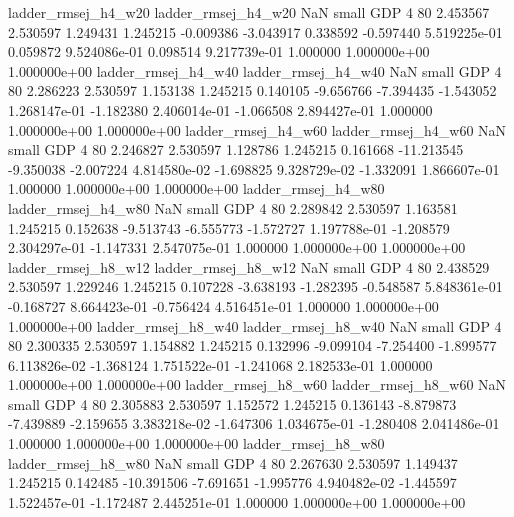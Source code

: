      ladder_rmsej_h4_w20      ladder_rmsej_h4_w20                   NaN      small      GDP                 4 80 2.453567       2.530597 1.249431       1.245215   -0.009386     -3.043917      0.338592    -0.597440   5.519225e-01  0.059872 9.524086e-01     0.098514   9.217739e-01            1.000000    1.000000e+00        1.000000e+00
     ladder_rmsej_h4_w40      ladder_rmsej_h4_w40                   NaN      small      GDP                 4 80 2.286223       2.530597 1.153138       1.245215    0.140105     -9.656766     -7.394435    -1.543052   1.268147e-01 -1.182380 2.406014e-01    -1.066508   2.894427e-01            1.000000    1.000000e+00        1.000000e+00
     ladder_rmsej_h4_w60      ladder_rmsej_h4_w60                   NaN      small      GDP                 4 80 2.246827       2.530597 1.128786       1.245215    0.161668    -11.213545     -9.350038    -2.007224   4.814580e-02 -1.698825 9.328729e-02    -1.332091   1.866607e-01            1.000000    1.000000e+00        1.000000e+00
     ladder_rmsej_h4_w80      ladder_rmsej_h4_w80                   NaN      small      GDP                 4 80 2.289842       2.530597 1.163581       1.245215    0.152638     -9.513743     -6.555773    -1.572727   1.197788e-01 -1.208579 2.304297e-01    -1.147331   2.547075e-01            1.000000    1.000000e+00        1.000000e+00
     ladder_rmsej_h8_w12      ladder_rmsej_h8_w12                   NaN      small      GDP                 4 80 2.438529       2.530597 1.229246       1.245215    0.107228     -3.638193     -1.282395    -0.548587   5.848361e-01 -0.168727 8.664423e-01    -0.756424   4.516451e-01            1.000000    1.000000e+00        1.000000e+00
     ladder_rmsej_h8_w40      ladder_rmsej_h8_w40                   NaN      small      GDP                 4 80 2.300335       2.530597 1.154882       1.245215    0.132996     -9.099104     -7.254400    -1.899577   6.113826e-02 -1.368124 1.751522e-01    -1.241068   2.182533e-01            1.000000    1.000000e+00        1.000000e+00
     ladder_rmsej_h8_w60      ladder_rmsej_h8_w60                   NaN      small      GDP                 4 80 2.305883       2.530597 1.152572       1.245215    0.136143     -8.879873     -7.439889    -2.159655   3.383218e-02 -1.647306 1.034675e-01    -1.280408   2.041486e-01            1.000000    1.000000e+00        1.000000e+00
     ladder_rmsej_h8_w80      ladder_rmsej_h8_w80                   NaN      small      GDP                 4 80 2.267630       2.530597 1.149437       1.245215    0.142485    -10.391506     -7.691651    -1.995776   4.940482e-02 -1.445597 1.522457e-01    -1.172487   2.445251e-01            1.000000    1.000000e+00        1.000000e+00
